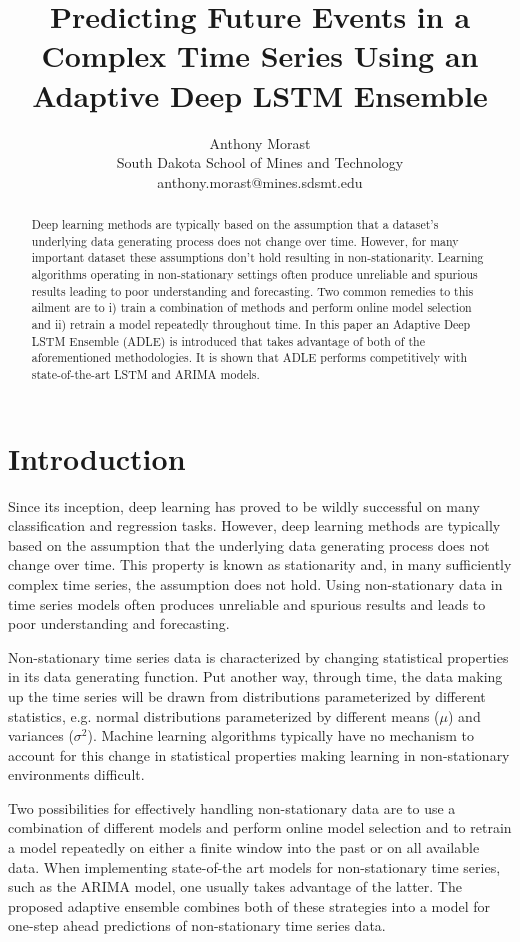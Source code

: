 \documentclass{article}
\title{Predicting Future Events in a Complex Time Series Using an Adaptive Deep LSTM Ensemble}
\author{Anthony Morast\\
		South Dakota School of Mines and Technology\\
        anthony.morast@mines.sdsmt.edu}
\begin{document}
\maketitle

\begin{abstract}
  Deep learning methods are typically based on the assumption that a dataset's underlying data generating process does not change over time. However, for many important dataset these assumptions don't hold resulting in non-stationarity. Learning algorithms operating in non-stationary settings often produce unreliable and spurious results leading to poor understanding and forecasting. Two common remedies to this ailment are to i) train a combination of methods and perform online model selection and ii) retrain a model repeatedly throughout time. In this paper an Adaptive Deep LSTM Ensemble (ADLE) is introduced that takes advantage of both of the aforementioned methodologies. It is shown that ADLE performs competitively with state-of-the-art LSTM and ARIMA models. 
\end{abstract}

\section{Introduction}

Since its inception, deep learning has proved to be wildly successful on many classification and regression tasks. However, deep learning methods are typically based on the assumption that the underlying data generating process does not change over time. This property is known as stationarity and, in many sufficiently complex time series, the assumption does not hold. Using non-stationary data in time series models often produces unreliable and spurious results and leads to poor understanding and forecasting.

Non-stationary time series data is characterized by changing statistical properties in its data generating function. Put another way, through time, the data making up the time series will be drawn from distributions parameterized by different statistics, e.g. normal distributions parameterized by different means ($\mu$) and variances ($\sigma^2$). Machine learning algorithms typically have no mechanism to account for this change in statistical properties making learning in non-stationary environments difficult.

Two possibilities for effectively handling non-stationary data are to use a combination of different models and perform online model selection and to retrain a model repeatedly on either a finite window into the past or on all available data. When implementing state-of-the art models for non-stationary time series, such as the ARIMA model, one usually takes advantage of the latter. The proposed adaptive ensemble combines both of these strategies into a model for one-step ahead predictions of non-stationary time series data.
\end{document}
